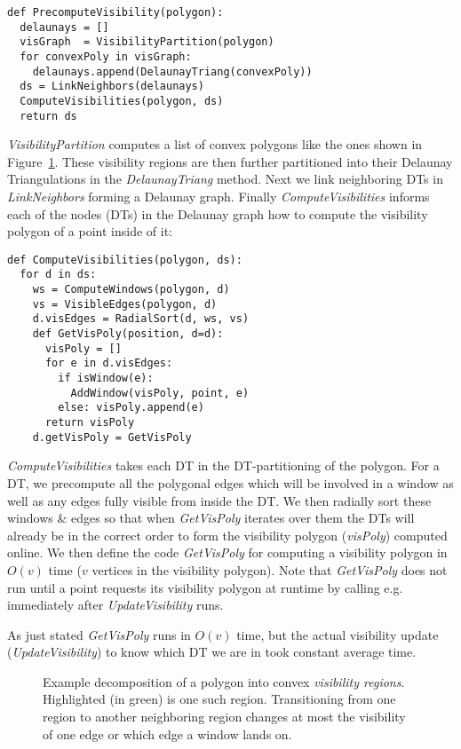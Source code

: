 \begin{samepage}
\begin{verbatim}
def PrecomputeVisibility(polygon):
  delaunays = []
  visGraph  = VisibilityPartition(polygon)
  for convexPoly in visGraph:
    delaunays.append(DelaunayTriang(convexPoly))
  ds = LinkNeighbors(delaunays)
  ComputeVisibilities(polygon, ds)
  return ds
\end{verbatim}
\end{samepage}

\emph{VisibilityPartition} computes a list of convex polygons like the
ones shown in Figure~\ref{fig:visibility-regions}. These visibility
regions are then further partitioned into their Delaunay Triangulations
in the \emph{DelaunayTriang} method. Next we link neighboring
DTs in \emph{LinkNeighbors} forming a Delaunay graph. Finally
\emph{ComputeVisibilities} informs each of the nodes (DTs) in the
Delaunay graph how to compute the visibility polygon of a point inside
of it:

\begin{verbatim}
def ComputeVisibilities(polygon, ds):
  for d in ds:
    ws = ComputeWindows(polygon, d)
    vs = VisibleEdges(polygon, d)
    d.visEdges = RadialSort(d, ws, vs)
    def GetVisPoly(position, d=d):
      visPoly = []
      for e in d.visEdges:
        if isWindow(e):
          AddWindow(visPoly, point, e)
        else: visPoly.append(e)
      return visPoly
    d.getVisPoly = GetVisPoly
\end{verbatim}

\emph{ComputeVisibilities} takes each DT in the DT-partitioning of
the polygon. For a DT, we precompute all the polygonal edges which
will be involved in a window as well as any edges fully visible from
inside the DT. We then radially sort these windows \& edges so that
when \emph{GetVisPoly} iterates over them the DTs will already be in
the correct order to form the visibility polygon (\emph{visPoly})
computed online. We then define the code \emph{GetVisPoly} for computing
a visibility polygon in $O(v)$ time ($v$ vertices in the visibility
polygon). Note that \emph{GetVisPoly} does not run until a point
requests its visibility polygon at runtime by calling
 e.g. immediately after
\emph{UpdateVisibility} runs.

As just stated \emph{GetVisPoly} runs in $O(v)$ time, but the
actual visibility update (\emph{UpdateVisibility}) to know which
DT we are in took constant average time.

\begin{figure}
  \begin{center}
    
  \end{center}
  \caption{\label{fig:visibility-regions}
    Example decomposition of a polygon into convex
    \emph{visibility regions}. Highlighted (in green) is one such
    region. Transitioning from one region to another neighboring
    region changes at most the visibility of one edge or which edge
    a window lands on.
  }
\end{figure}

